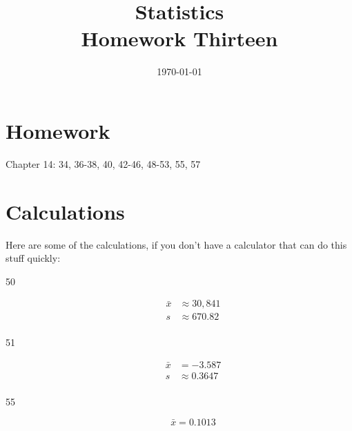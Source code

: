\documentclass[letterpaper]{exam}
\title{Statistics \\ Homework Thirteen}
\date{\today}
\author{}
\begin{document}
  \maketitle

  \section{Homework}
  Chapter 14: 34, 36-38, 40, 42-46, 48-53, 55, 57

  \ifprintanswers
  \else
    \section{Calculations}
    Here are some of the calculations, if you don't have a calculator that can do
    this stuff quickly:

    \begin{description}
      \item[50]
        \begin{align*}
          \bar{x} & \approx 30,841 \\
          s       & \approx 670.82 \\
        \end{align*}

      \item[51]
        \begin{align*}
          \bar{x} & = -3.587 \\
          s       & \approx 0.3647 \\
        \end{align*}

      \item[55] 
        \[
          \bar{x} = 0.1013
        \]

    \end{description}
  \fi

  \ifprintanswers
\end{document}
